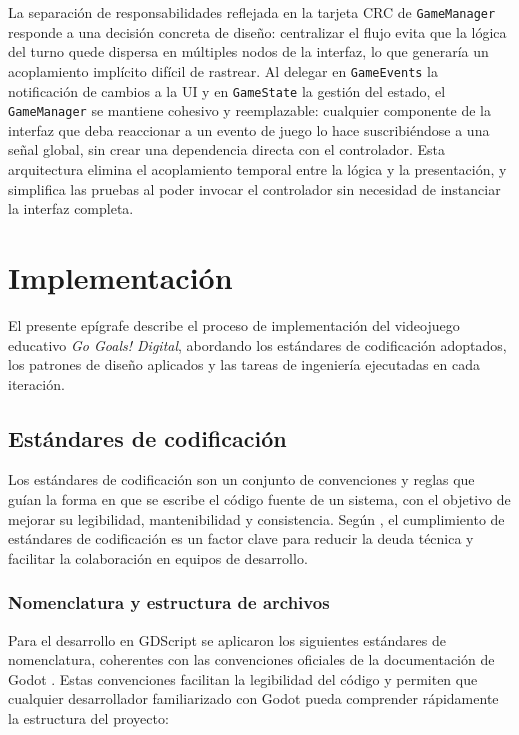 La separación de responsabilidades reflejada en la tarjeta CRC de \texttt{GameManager} responde a una decisión concreta de diseño: centralizar el flujo evita que la lógica del turno quede dispersa en múltiples nodos de la interfaz, lo que generaría un acoplamiento implícito difícil de rastrear. Al delegar en \texttt{GameEvents} la notificación de cambios a la UI y en \texttt{GameState} la gestión del estado, el \texttt{GameManager} se mantiene cohesivo y reemplazable: cualquier componente de la interfaz que deba reaccionar a un evento de juego lo hace suscribiéndose a una se\~nal global, sin crear una dependencia directa con el controlador. Esta arquitectura elimina el acoplamiento temporal entre la lógica y la presentación, y simplifica las pruebas al poder invocar el controlador sin necesidad de instanciar la interfaz completa.



\section{Implementación}
\label{sec:implementacion}

El presente epígrafe describe el proceso de implementación del videojuego educativo \textit{Go Goals! Digital}, abordando los estándares de codificación adoptados, los patrones de diseño aplicados y las tareas de ingeniería ejecutadas en cada iteración.

\subsection{Estándares de codificación}
\label{subsec:estandares}

Los estándares de codificación son un conjunto de convenciones y reglas que guían la forma en que se escribe el código fuente de un sistema, con el objetivo de mejorar su legibilidad, mantenibilidad y consistencia. Según \citeauthor{Sommerville2021} \parencite{Sommerville2021}, el cumplimiento de estándares de codificación es un factor clave para reducir la deuda técnica y facilitar la colaboración en equipos de desarrollo.

\subsubsection{Nomenclatura y estructura de archivos}
\label{subsubsec:nomenclatura}

Para el desarrollo en GDScript se aplicaron los siguientes estándares de nomenclatura, coherentes con las convenciones oficiales de la documentación de Godot \parencite{GodotDocs2026}. Estas convenciones facilitan la legibilidad del código y permiten que cualquier desarrollador familiarizado con Godot pueda comprender rápidamente la estructura del proyecto:

